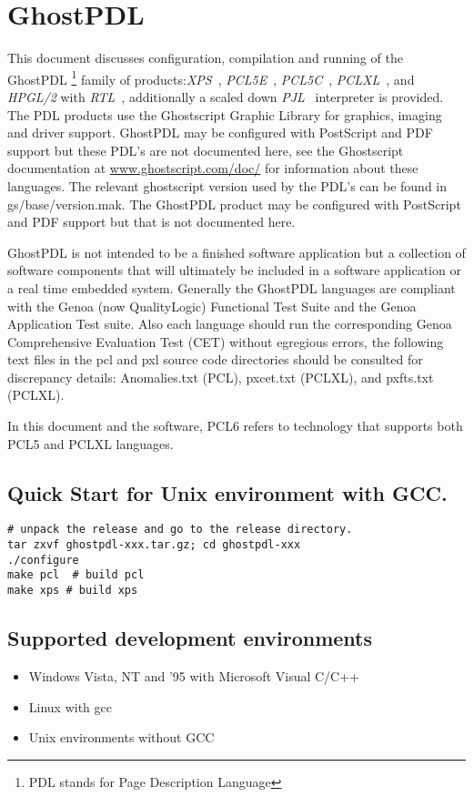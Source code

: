 \documentclass[10pt]{article}
\begin{document}
\section*{GhostPDL}

This document discusses configuration, compilation and running of the
GhostPDL \footnote{PDL stands for Page Description Language} family of products:\emph {XPS}~\cite{XPSMAN}, \emph {PCL5E}~\cite{PCLTRM},
\emph{PCL5C}~\cite{PCL5CTRM}, \emph{PCLXL}~\cite{PCLXLTRM}, and
\emph{HPGL/2} with \emph{RTL}~\cite{RTLTRM}, additionally a scaled
down \emph{PJL}~\cite{PJLTRM} interpreter is provided.  The PDL
products use the Ghostscript Graphic Library for graphics, imaging and
driver support.  GhostPDL may be configured with PostScript and PDF support but these PDL's are not documented here, see the Ghostscript documentation at
\url{www.ghostscript.com/doc/} for information about these languages.
The relevant ghostscript version used by the PDL's  can be found
in gs/base/version.mak.  The GhostPDL product may be configured with 
PostScript and PDF support but that is not documented here.


GhostPDL is not intended to be a finished software application but a
collection of software components that will ultimately be included in
a software application or a real time embedded system. Generally the
GhostPDL languages are compliant with the Genoa (now QualityLogic)
Functional Test Suite and the Genoa Application Test suite.  Also each
language should run the corresponding Genoa Comprehensive Evaluation
Test (CET) without egregious errors, the following text files in the
pcl and pxl source code directories should be consulted for
discrepancy details: Anomalies.txt (PCL), pxcet.txt (PCLXL), and
pxfts.txt (PCLXL).

In this document and the software, PCL6 refers to technology that
supports both PCL5 and PCLXL languages.

\subsection*{Quick Start for Unix environment with GCC.}
\begin{verbatim}
# unpack the release and go to the release directory.
tar zxvf ghostpdl-xxx.tar.gz; cd ghostpdl-xxx
./configure
make pcl  # build pcl
make xps # build xps
\end{verbatim}

\subsection*{Supported development environments}
\begin{itemize}
\item Windows Vista, NT and '95 with Microsoft Visual C/C++
\item Linux with gcc
\item Unix environments without GCC
\end{itemize}
\end{document}
